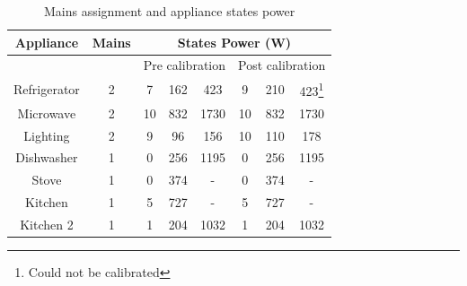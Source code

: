 \documentclass[conference]{IEEEtran}
\begin{document}
\begin{table}
\caption{Mains assignment and appliance states power}
\label{tab:calibration_factors}
\begin{tabular}{|c|c|c|c|c|c|c|c|}
\hline
Appliance & Mains & \multicolumn{6}{|c|}{States Power (W)}\\
\hline
&&\multicolumn{3}{|c|}{Pre calibration}&\multicolumn{3}{|c|}{Post calibration}\\
\hline
Refrigerator & 2& 7&162&423 & 9&210&423\footnote{Could not be calibrated}\\
Microwave &2& 10&832&1730& 10&832&1730\\
Lighting & 2& 9&96&156&10&110&178\\
Dishwasher & 1& 0&256& 1195 & 0&256& 1195\\
Stove& 1 & 0&374&-& 0&374&-\\
Kitchen & 1& 5&727&-&5&727&-\\
Kitchen 2&1 & 1&204&1032&1&204&1032 \\
%
%
\hline
%
\end{tabular}
\end{table}
\end{document}
